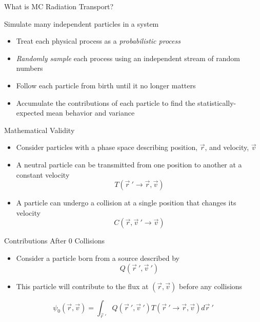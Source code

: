 \documentclass[xcolor=x11names,compress, handout]{beamer}
\renewcommand{\(}{\begin{columns}}
\renewcommand{\)}{\end{columns}}
\newcommand{\<}[1]{\begin{column}{#1}}
\renewcommand{\>}{\end{column}}
\begin{document}
\begin{frame}{What is MC Radiation Transport?}

Simulate many independent particles in a system
\begin{itemize}
\item Treat each physical process as a
\textit{probabilistic process}
\pause
\item \textit{Randomly sample} each process using an
independent stream of random numbers
\pause
\item Follow each particle from birth until it no
longer matters
\pause
\item Accumulate the contributions of each
particle to find the statistically-expected
mean behavior and variance
\end{itemize}

\end{frame}


\begin{frame}{Mathematical Validity}

\begin{itemize}
\item Consider particles with a phase space
describing position, $\vec{r}$, and velocity, $\vec{v}$
\vspace*{0.5 em}
\item A neutral particle can be transmitted
from one position to another at a
constant velocity
\[T(\vec{r}\:' \rightarrow \vec{r}, \vec{v})\]
\pause
\item A particle can undergo a collision at a
single position that changes its velocity
\[C(\vec{r}, \vec{v}\:' \rightarrow \vec{v})\]
\end{itemize}

\end{frame}


\begin{frame}{Contributions After 0 Collisions}

\begin{itemize}
\item Consider a particle born from a source
described by 
\[Q(\vec{r}\:', \vec{v}\:')\]
\item This particle will contribute to the flux at $(\vec{r}, \vec{v})$ before any collisions
\end{itemize}

\[\psi_0(\vec{r}, \vec{v}) = \int_{\vec{r}\:'} Q(\vec{r}\:', \vec{v}\:')T(\vec{r}\:' \rightarrow \vec{r}, \vec{v}) d\vec{r}\:'\]

\end{frame}
\end{document}

